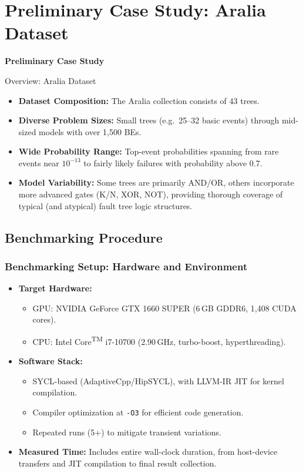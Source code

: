 \section{Preliminary Case Study: Aralia Dataset}
\begin{frame}
    \Huge{\centerline{\textbf{Preliminary Case Study}}}
\end{frame}

\begin{frame}[t]{Overview: Aralia Dataset}
\begin{itemize}
  \item \textbf{Dataset Composition:} The Aralia collection consists of 43 trees.
  \item \textbf{Diverse Problem Sizes:} Small trees (e.g.\ 25--32 basic events) through mid-sized models with over 1{,}500 BEs.  
  \item \textbf{Wide Probability Range:} Top-event probabilities spanning from rare events near \(10^{-13}\) to fairly likely failures with probability above 0.7.  
  \item \textbf{Model Variability:} Some trees are primarily AND/OR, others incorporate more advanced gates (K/N, XOR, NOT), providing thorough coverage of typical (and atypical) fault tree logic structures.
\end{itemize}
\end{frame}

\subsection{Benchmarking Procedure}
\begin{frame}[t]
\frametitle{Benchmarking Setup: Hardware and Environment}
\begin{itemize}
  \item \textbf{Target Hardware:}
    \begin{itemize}
      \item GPU: NVIDIA\textsuperscript{\textregistered} GeForce GTX 1660 SUPER (6\,GB GDDR6, 1{,}408 CUDA cores).
      \item CPU: Intel\textsuperscript{\textregistered} Core\textsuperscript{TM} i7-10700 (2.90\,GHz, turbo-boost, hyperthreading).
    \end{itemize}
  \item \textbf{Software Stack:}
    \begin{itemize}
      \item SYCL-based (AdaptiveCpp/HipSYCL), with LLVM-IR JIT for kernel compilation.
      \item Compiler optimization at \texttt{-O3} for efficient code generation.
      \item Repeated runs (5+) to mitigate transient variations.
    \end{itemize}
  \item \textbf{Measured Time:} Includes entire wall-clock duration, from host-device transfers and JIT compilation to final result collection.
\end{itemize}
\end{frame}

